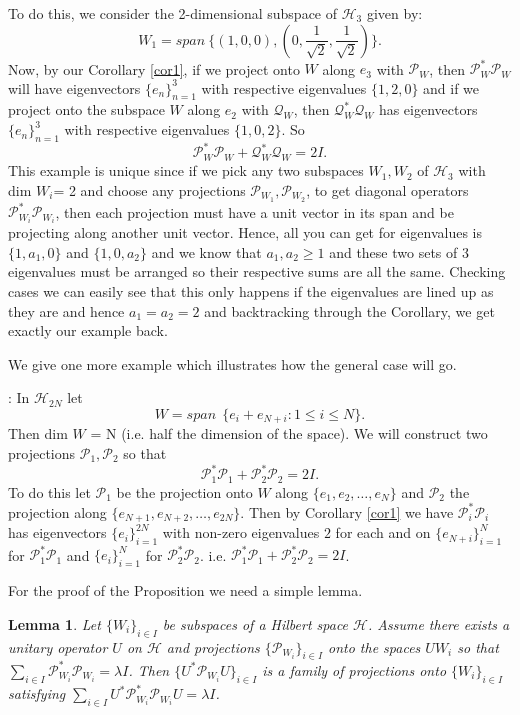\documentclass[11pt,reqno]{amsart}
\newtheorem{lemma}[thm]{Lemma}
\theoremstyle{remark}
\begin{document}
To do this, we consider the 2-dimensional subspace of ${\mathcal H}_3$ given by:
\[ W_1 = span\ \{(1,0,0),(0,\frac{1}{\sqrt{2}},\frac{1}{\sqrt{2}})\}.\]
Now, by our Corollary \ref{cor1}, if we project onto $W$ along $e_3$ with
${\mathcal P}_W$, then ${\mathcal P}_W^{*}{\mathcal P}_W$ will have eigenvectors $\{e_n\}_{n=1}^3$
with respective eigenvalues $\{1,2,0\}$ and if we project onto the subspace
$W$ along $e_2$ with ${\mathcal Q}_W$, then ${\mathcal Q}_W^{*}{\mathcal Q}_W$ has eigenvectors
$\{e_n\}_{n=1}^3$ with respective eigenvalues $\{1,0,2\}$.  So
\[ {\mathcal P}_W^{*}{\mathcal P}_W + {\mathcal Q}_W^{*}{\mathcal Q}_W = 2I.\]
This example is unique since if we pick any two subspaces $W_1,W_2$ of
${\mathcal H}_3$ with dim $W_i$= 2 and choose any projections ${\mathcal P}_{W_1},{\mathcal P}_{W_2}$,
to get diagonal operators ${\mathcal P}_{W_i}^{*}{\mathcal P}_{W_i}$, then each projection must have
a unit vector in its span and be projecting along another unit vector.  Hence,
all you can get for eigenvalues is $\{1,a_1,0\}$ and $\{1,0,a_2\}$ and
we know that $a_1,a_2\ge 1$ and these two sets of 3 eigenvalues must be
arranged so their respective sums are all the same.  Checking cases we can
easily see that this only happens if the eigenvalues are lined up as they are
and hence $a_1=a_2 = 2$ and backtracking through the Corollary, we get
exactly our example back.
\vskip12pt

We give one more example which illustrates how the general case will go.
\vskip12pt

:  In ${\mathcal H}_{2N}$ let
\[ W = span\ \ \{e_i+e_{N+i}: 1\le i \le N\}.\]
Then dim $W$ = N (i.e. half the dimension of the space).
We will construct two projections ${\mathcal P}_1,{\mathcal P}_2$ so that
\[ {\mathcal P}_1^{*}{\mathcal P}_1 + {\mathcal P}_2^{*}{\mathcal P}_2 = 2I.\]
To do this let ${\mathcal P}_1$ be the projection onto $W$ along $\{e_1,e_2,\ldots,e_N\}$
and ${\mathcal P}_2$ the projection along $\{e_{N+1},e_{N+2},\ldots,e_{2N}\}$.  Then
by Corollary \ref{cor1} we have ${\mathcal P}_{i}^{*}{\mathcal P}_i$ has eigenvectors
$\{e_i\}_{i=1}^{2N}$ with non-zero eigenvalues $2$ for each and on
$\{e_{N+i}\}_{i=1}^N$ for ${\mathcal P}_1^{*}{\mathcal P}_1$ and $\{e_{i}\}_{i=1}^N$ for ${\mathcal P}_2^{*}{\mathcal P}_2$.
i.e.  ${\mathcal P}_1^{*}{\mathcal P}_1+{\mathcal P}_2^{*}{\mathcal P}_2 = 2I$.
\vskip12pt

For the proof of the Proposition we need a simple lemma.

\begin{lemma}\label{lem1}
Let $\{W_i\}_{i\in I}$ be subspaces of a Hilbert space ${\mathcal H}$.
Assume there exists a unitary operator $U$
on ${\mathcal H}$ and projections $\{{\mathcal P}_{W_i}\}_{i\in I}$ onto the spaces $UW_i$
so that $\sum_{i\in I}{\mathcal P}_{W_i}^{*}{\mathcal P}_{W_i} = \lambda I$. Then
$\{U^{*}{\mathcal P}_{W_i}U\}_{i\in I}$ is a family of projections onto $\{W_i\}_{i\in I}$
satisfying $\sum_{i\in I}U^{*}{\mathcal P}_{W_i}^{*}{\mathcal P}_{W_i}U = \lambda I$.
\end{lemma}
\end{document}
